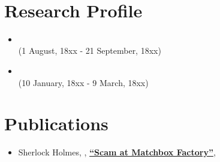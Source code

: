 \documentclass{My_CV}
\begin{document}
\begin{paracol}{2}
\begin{leftcolumn}
\end{leftcolumn}



\begin{rightcolumn}



 \\



\section{{\faFlask} Research Profile}

\begin{itemize}

    \item {} \\
     \hfill{(1 August, 18xx - 21 September, 18xx)}
    
    \item {} \\
     \hfill{(10 January, 18xx  - 9 March, 18xx)}
    
\end{itemize}



\section{{\faBook} Publications}

\begin{itemize}

    \item Sherlock Holmes, , \href{https://google.com}{\textbf{“Scam at Matchbox Factory”}}, 
    

\end{itemize}
\end{rightcolumn}
\end{paracol}
\end{document}
